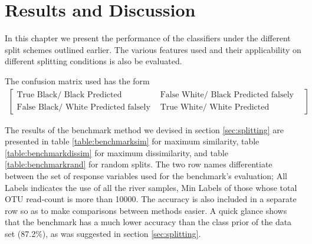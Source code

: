 \chapter{Results and Discussion}
\label{chap:results}
\ifpdf
    \graphicspath{{Chapter3/Figs/Raster/}{Chapter3/Figs/PDF/}{Chapter3/Figs/}}
\else
    \graphicspath{{Chapter3/Figs/Vector/}{Chapter3/Figs/}}
\fi

In this chapter we present the performance of the classifiers under the different split schemes outlined earlier. The various features used and their applicability on different splitting conditions is also be evaluated. 

The confusion matrix used has the form 
\begin{align}
	\begin{bmatrix}
	\text{True Black/ Black Predicted correctly}&\text{False White/ Black  Predicted falsely}\\
	\text{False Black/ White Predicted falsely}&\text{True White/ White  Predicted correctly}
	\end{bmatrix}
\end{align}



The results of the benchmark method we devised in section \ref{sec:splitting} are presented in table \ref{table:benchmarksim} for maximum similarity, table \ref{table:benchmarkdissim} for maximum dissimilarity, and table \ref{table:benchmarkrand} for random splits. The two row names differentiate between the set of response variables used for the benchmark's evaluation; All Labels indicates the use of all the river samples, Min Labels of those whose total OTU read-count is more than 10000. The accuracy is also included in a separate row so as to make comparisons between methods easier. A quick glance shows that the benchmark has a much lower accuracy than the class prior of the data set (87.2\%), as was suggested in section \ref{sec:splitting}.



